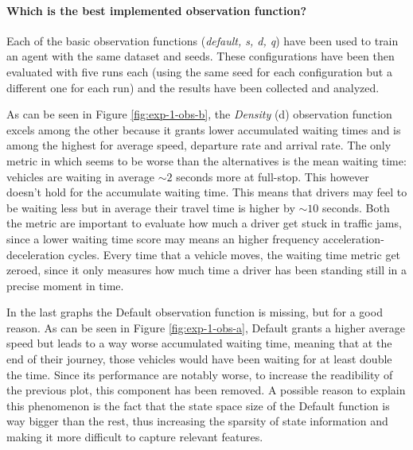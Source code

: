 \paragraph{Which is the best implemented observation function?}

Each of the basic observation functions (\textit{default, s, d, q}) have been used to train an agent with the same dataset and seeds. These configurations have been then evaluated with five runs each (using the same seed for each configuration but a different one for each run) and the results have been collected and analyzed.

As can be seen in Figure \ref{fig:exp-1-obs-b}, the \textit{Density} (d) observation function excels among the other because it grants lower accumulated waiting times and is among the highest for average speed, departure rate and arrival rate.
The only metric in which seems to be worse than the alternatives is the mean waiting time: vehicles are waiting in average $\sim2$ seconds more at full-stop.
This however doesn't hold for the accumulate waiting time.
This means that drivers may feel to be waiting less but in average their travel time is higher by $\sim10$ seconds.
Both the metric are important to evaluate how much a driver get stuck in traffic jams, since a lower waiting time score may means an higher frequency acceleration-deceleration cycles.
Every time that a vehicle moves, the waiting time metric get zeroed, since it only measures how much time a driver has been standing still in a precise moment in time.

In the last graphs the Default observation function is missing, but for a good reason.
As can be seen in Figure \ref{fig:exp-1-obs-a}, Default grants a higher average speed but leads to a way worse accumulated waiting time, meaning that at the end of their journey, those vehicles would have been waiting for at least double the time.
Since its performance are notably worse, to increase the readibility of the previous plot, this component has been removed.
A possible reason to explain this phenomenon is the fact that the state space size of the Default function is way bigger than the rest, thus increasing the sparsity of state information and making it more difficult to capture relevant features.



